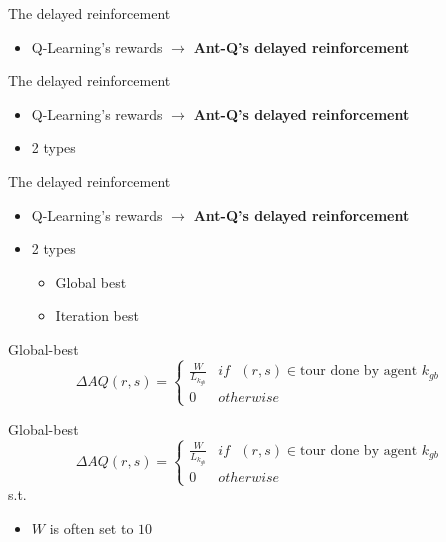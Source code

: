 \documentclass[aspectratio=169,xcolor=dvipsnames]{beamer}
\begin{document}
\begin{frame}{The delayed reinforcement}
    \begin{itemize}
        \item Q-Learning's rewards $\rightarrow$ \textbf{\alert{Ant-Q's delayed reinforcement}}
    \end{itemize}
\end{frame}

\begin{frame}{The delayed reinforcement}
    \begin{itemize}
        \item Q-Learning's rewards $\rightarrow$ \textbf{\alert{Ant-Q's delayed reinforcement}}
        \item 2 types 
    \end{itemize}
\end{frame}

\begin{frame}{The delayed reinforcement}
    \begin{itemize}
        \item Q-Learning's rewards $\rightarrow$ \textbf{\alert{Ant-Q's delayed reinforcement}}
        \item 2 types 
        \begin{itemize}
            \item Global best
            \item Iteration best
        \end{itemize}
    \end{itemize}
\end{frame}

\begin{frame}{Global-best}
    \begin{equation*}
        \Delta AQ(r,s )= \begin{cases}\frac{W}{L_{k_{gb}}} &if\text{ }(r, s) \in \text {tour done by agent }k_{gb}\\0 &otherwise\end{cases}
    \end{equation*}
\end{frame}

\begin{frame}{Global-best}
    \begin{equation*}
        \Delta AQ(r,s )= \begin{cases}\frac{W}{L_{k_{gb}}} &if\text{ }(r, s) \in \text {tour done by agent }k_{gb}\\0 &otherwise\end{cases}
    \end{equation*}
    s.t.\\
    \begin{itemize}
        \item $W$ is often set to $10$
    \end{itemize}
\end{frame}
\end{document}
